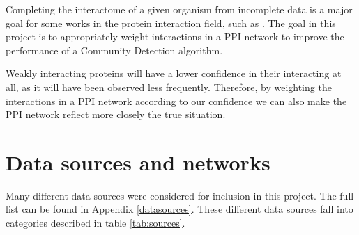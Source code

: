 Completing the interactome of a given organism from incomplete data is a major goal for some works in the protein interaction field, such as \textcite{rodgers-melnick_predicting_2013}.
The goal in this project is to appropriately weight interactions in a PPI network to improve the performance of a Community Detection algorithm.

Weakly interacting proteins will have a lower confidence in their interacting at all, as it will have been observed less frequently.
Therefore, by weighting the interactions in a PPI network according to our confidence we can also make the PPI network reflect more closely the true situation. %

\section{Data sources and networks}
\label{back:sources}

Many different data sources were considered for inclusion in this project. %
The full list can be found in Appendix \ref{datasources}.
These different data sources fall into categories described in table \ref{tab:sources}.

